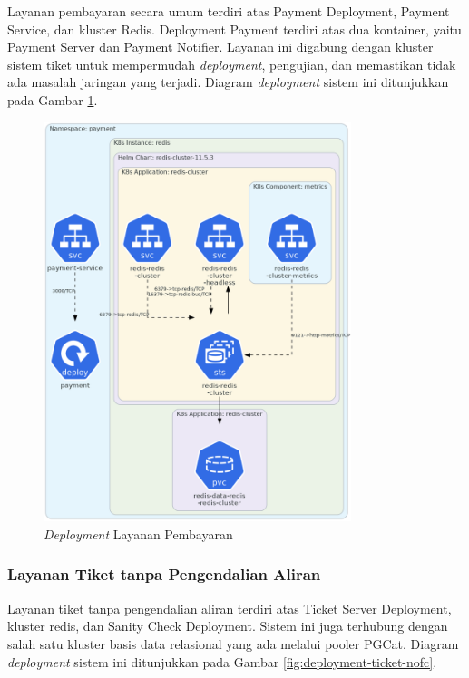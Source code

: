 Layanan pembayaran secara umum terdiri atas Payment Deployment, Payment Service, dan kluster Redis. Deployment Payment terdiri atas dua kontainer, yaitu Payment Server dan Payment Notifier. Layanan ini digabung dengan kluster sistem tiket untuk mempermudah \textit{deployment}, pengujian, dan memastikan tidak ada masalah jaringan yang terjadi. Diagram \textit{deployment} sistem ini ditunjukkan pada Gambar \ref{fig:deployment-payment}.

\begin{figure}[H]
    \centering
    \includegraphics[width=0.8\textwidth]{resources/chapter-4/payment.png}
    \caption{\textit{Deployment} Layanan Pembayaran}
    \label{fig:deployment-payment}
\end{figure}


\pagebreak

\subsubsection{Layanan Tiket tanpa Pengendalian Aliran}

Layanan tiket tanpa pengendalian aliran terdiri atas Ticket Server Deployment, kluster redis, dan Sanity Check Deployment. Sistem ini juga terhubung dengan salah satu kluster basis data relasional yang ada melalui pooler PGCat. Diagram \textit{deployment} sistem ini ditunjukkan pada Gambar \ref{fig:deployment-ticket-nofc}.

